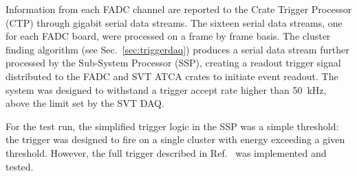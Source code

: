 Information from each FADC channel are reported to the Crate Trigger Processor (CTP) through gigabit 
serial data streams. The sixteen serial data streams, one for each FADC board, were processed on a frame 
by frame basis. The cluster finding algorithm (see Sec.~\ref{sec:triggerdaq}) produces a serial data 
stream further processed by the Sub-System Processor (SSP), creating a readout trigger signal 
distributed to the FADC and SVT ATCA crates to initiate event readout. The system was designed to withstand 
a trigger accept rate higher than 50~kHz, above the limit set by the SVT DAQ.  

For the test run, the simplified trigger logic in the SSP was a simple threshold: the trigger was designed 
to fire on a single cluster with energy exceeding a given threshold. However, the full trigger described in 
Ref.~\cite{HPS_tPROP} was implemented and tested.
